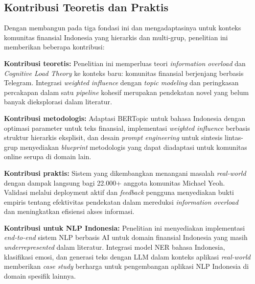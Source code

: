 \subsection{Kontribusi Teoretis dan Praktis}

Dengan membangun pada tiga fondasi ini dan mengadaptasinya untuk konteks komunitas finansial Indonesia yang hierarkis dan multi-grup, penelitian ini memberikan beberapa kontribusi:

\textbf{Kontribusi teoretis:} Penelitian ini memperluas teori \textit{information overload} dan \textit{Cognitive Load Theory} ke konteks baru: komunitas finansial berjenjang berbasis Telegram. Integrasi \textit{weighted influence} dengan \textit{topic modeling} dan peringkasan percakapan dalam satu \textit{pipeline} kohesif merupakan pendekatan novel yang belum banyak dieksplorasi dalam literatur.

\textbf{Kontribusi metodologis:} Adaptasi BERTopic untuk bahasa Indonesia dengan optimasi parameter untuk teks finansial, implementasi \textit{weighted influence} berbasis struktur hierarkis eksplisit, dan desain \textit{prompt engineering} untuk sintesis lintas-grup menyediakan \textit{blueprint} metodologis yang dapat diadaptasi untuk komunitas online serupa di domain lain.

\textbf{Kontribusi praktis:} Sistem yang dikembangkan menangani masalah \textit{real-world} dengan dampak langsung bagi 22.000+ anggota komunitas Michael Yeoh. Validasi melalui deployment aktif dan \textit{feedback} pengguna menyediakan bukti empiris tentang efektivitas pendekatan dalam mereduksi \textit{information overload} dan meningkatkan efisiensi akses informasi.

\textbf{Kontribusi untuk NLP Indonesia:} Penelitian ini menyediakan implementasi \textit{end-to-end} sistem NLP berbasis AI untuk domain finansial Indonesia yang masih \textit{underrepresented} dalam literatur. Integrasi model NER bahasa Indonesia, klasifikasi emosi, dan generasi teks dengan LLM dalam konteks aplikasi \textit{real-world} memberikan \textit{case study} berharga untuk pengembangan aplikasi NLP Indonesia di domain spesifik lainnya.
